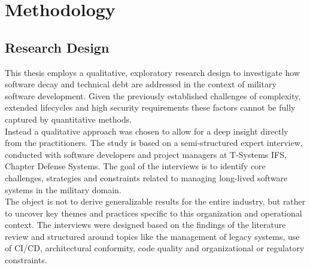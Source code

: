 \section{Methodology}
\subsection{Research Design}
This thesis employs a qualitative, exploratory research design to investigate how software decay and technical debt are addressed in the context of military software development. Given the previously established challenges of complexity, extended lifecycles and high security requirements these factors
cannot be fully captured by quantitative methods.\\
Instead a qualitative approach was chosen to allow for a deep insight directly from the practitioners. The study is based on a semi-structured expert interview, conducted with software developers and project managers at T-Systems IFS, Chapter Defense Systems. 
The goal of the interviews is to identify core challenges, strategies and constraints related to managing long-lived software systems in the military domain.\\
The object is not to derive generalizable results for the entire industry, but rather to uncover key themes and practices specific to this organization and operational context. The interviews were designed based on the findings of the literature review and structured around topics like
the management of legacy systems, use of \ac{CI/CD}, architectural conformity, code quality and organizational or regulatory constraints.\\
